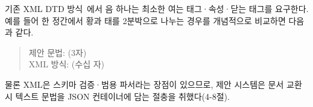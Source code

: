 기존 XML DTD 방식~\cite{lee2013xml}에서 음 하나는 최소한
여는 태그·속성·닫는 태그를 요구한다. 예를 들어 한 정간에서
황과 태를 2분박으로 나누는 경우를 개념적으로 비교하면 다음과 같다.

\begin{quote}\small
제안 문법:  (3자)\\[2pt]
XML 방식: \allowbreak
{} (수십 자)
\end{quote}


물론 XML은 스키마 검증·범용 파서라는 장점이 있으므로, 제안 시스템은
문서 교환 시 텍스트 문법을 JSON 컨테이너에 담는 절충을 취했다(4-8절).
